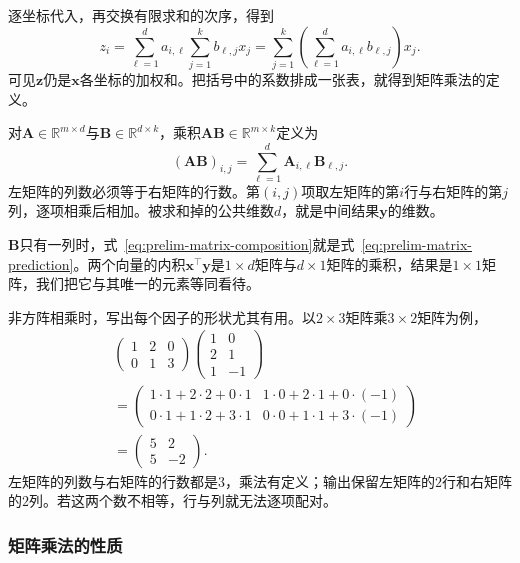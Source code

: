 逐坐标代入，再交换有限求和的次序，得到
\begin{equation}
 z_i=\sum_{\ell=1}^d a_{i,\ell}\sum_{j=1}^k b_{\ell,j}x_j
 =\sum_{j=1}^k\left(\sum_{\ell=1}^d a_{i,\ell}b_{\ell,j}\right)x_j.
 \label{eq:linear-algebra-matrix-product}
\end{equation}
可见$\bm z$仍是$\bm x$各坐标的加权和。把括号中的系数排成一张表，就得到矩阵乘法的定义。

对$\bm A\in\mathbb R^{m\times d}$与$\bm B\in\mathbb R^{d\times k}$，乘积$\bm A\bm B\in\mathbb R^{m\times k}$定义为
\begin{equation}
 (\bm A\bm B)_{i,j}=\sum_{\ell=1}^d\bm A_{i,\ell}\bm B_{\ell,j}.
 \label{eq:prelim-matrix-composition}
\end{equation}
左矩阵的列数必须等于右矩阵的行数。第$(i,j)$项取左矩阵的第$i$行与右矩阵的第$j$列，逐项相乘后相加。被求和掉的公共维数$d$，就是中间结果$\bm y$的维数。

$\bm B$只有一列时，式~\eqref{eq:prelim-matrix-composition}就是式~\eqref{eq:prelim-matrix-prediction}。两个向量的内积$\bm x^\top\bm y$是$1\times d$矩阵与$d\times1$矩阵的乘积，结果是$1\times1$矩阵，我们把它与其唯一的元素等同看待。

非方阵相乘时，写出每个因子的形状尤其有用。以$2\times3$矩阵乘$3\times2$矩阵为例，
\[
 \begin{aligned}
 &\begin{pmatrix}1&2&0\\0&1&3\end{pmatrix}
 \begin{pmatrix}1&0\\2&1\\1&-1\end{pmatrix}\\
 &=\begin{pmatrix}1\cdot1+2\cdot2+0\cdot1&1\cdot0+2\cdot1+0\cdot(-1)\\
 0\cdot1+1\cdot2+3\cdot1&0\cdot0+1\cdot1+3\cdot(-1)\end{pmatrix}\\
 &=\begin{pmatrix}5&2\\5&-2\end{pmatrix}.
 \end{aligned}
\]
左矩阵的列数与右矩阵的行数都是$3$，乘法有定义；输出保留左矩阵的$2$行和右矩阵的$2$列。若这两个数不相等，行与列就无法逐项配对。

\subsubsection{矩阵乘法的性质}
\label{sec:ls-matrix-operation-properties}

